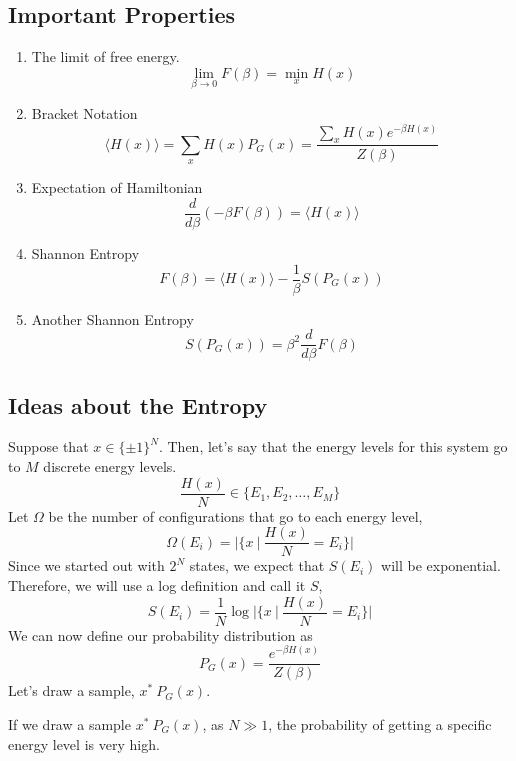 \documentclass[11pt]{article}
\begin{document}
\subsection{Important Properties}
\begin{enumerate}
	\item The limit of free energy.
		\[\lim_{\beta \to 0} F(\beta) = \min_x H(x)\]


	\item Bracket Notation
		\[ \langle H(x) \rangle = \sum_x H(x) P_G(x) = \frac{\sum_x H(x) e^{-\beta H(x) }}{Z(\beta)}\]
	
	\item Expectation of Hamiltonian
		\[ \frac{d}{d \beta} (-\beta F(\beta)) = \langle H(x) \rangle \]

	\item Shannon Entropy
		\[ F(\beta) = \langle H(x) \rangle - \frac{1}{\beta}S(P_G(x))\]

\item  Another Shannon Entropy
	\[ S(P_G(x)) = \beta^2 \frac{d}{d \beta} F(\beta)\]
\end{enumerate}


\subsection{Ideas about the Entropy}

	Suppose that $x \in \{\pm 1\}^N$. Then, let's say that the energy levels for this system go to $M$ discrete energy levels.
	\[ \frac{H(x)}{N} \in \{E_1, E_2, \dots, E_M\}\]
Let $\Omega$ be the number of configurations that go to each energy level,
\[ \Omega(E_i) = |\{ x ~ | ~ \frac{H(x)}{N} = E_i\}|\]
Since we started out with $2^N$ states, we expect that $S(E_i)$ will be exponential. 
Therefore, we will use a log definition and call it $S$, 
\[ S(E_i) = \frac{1}{N} \log |\{ x ~ | ~ \frac{H(x)}{N} = E_i\}|\]
We can now define our probability distribution as
\[ P_G(x) = \frac{e^{-\beta H(x)}}{Z(\beta)} \]
Let's draw a sample, $x^* ~ P_G(x)$. 

\begin{example}
	If we draw a sample $x^* ~ P_G(x)$, as $N \gg 1$, the probability of getting a specific energy level is very high.
\end{example}
\end{document}
